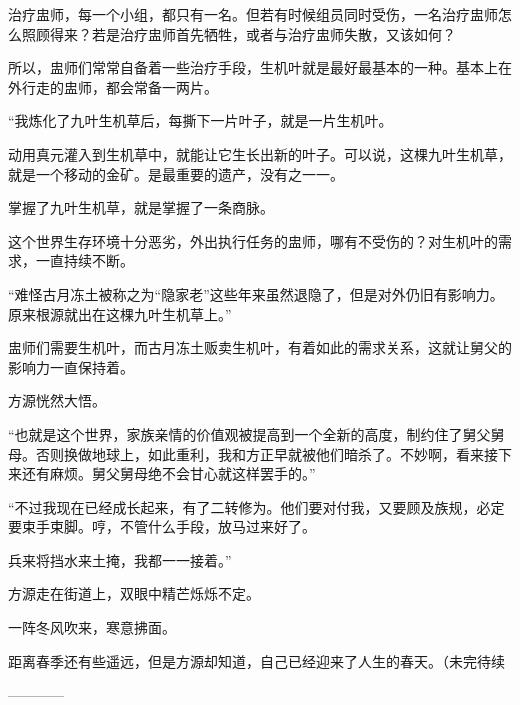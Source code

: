\begin{this_body}
治疗盅师，每一个小组，都只有一名。但若有时候组员同时受伤，一名治疗盅师怎么照顾得来？若是治疗盅师首先牺牲，或者与治疗盅师失散，又该如何？

所以，盅师们常常自备着一些治疗手段，生机叶就是最好最基本的一种。基本上在外行走的盅师，都会常备一两片。

“我炼化了九叶生机草后，每撕下一片叶子，就是一片生机叶。

动用真元灌入到生机草中，就能让它生长出新的叶子。可以说，这棵九叶生机草，就是一个移动的金矿。是最重要的遗产，没有之一一。

掌握了九叶生机草，就是掌握了一条商脉。

这个世界生存环境十分恶劣，外出执行任务的盅师，哪有不受伤的？对生机叶的需求，一直持续不断。

“难怪古月冻土被称之为“隐家老”这些年来虽然退隐了，但是对外仍旧有影响力。原来根源就出在这棵九叶生机草上。”

盅师们需要生机叶，而古月冻土贩卖生机叶，有着如此的需求关系，这就让舅父的影响力一直保持着。

方源恍然大悟。

“也就是这个世界，家族亲情的价值观被提高到一个全新的高度，制约住了舅父舅母。否则换做地球上，如此重利，我和方正早就被他们暗杀了。不妙啊，看来接下来还有麻烦。舅父舅母绝不会甘心就这样罢手的。”

“不过我现在已经成长起来，有了二转修为。他们要对付我，又要顾及族规，必定要束手束脚。哼，不管什么手段，放马过来好了。

兵来将挡水来土掩，我都一一接着。”

方源走在街道上，双眼中精芒烁烁不定。

一阵冬风吹来，寒意拂面。

距离春季还有些遥远，但是方源却知道，自己已经迎来了人生的春天。（未完待续

------------

\end{this_body}

